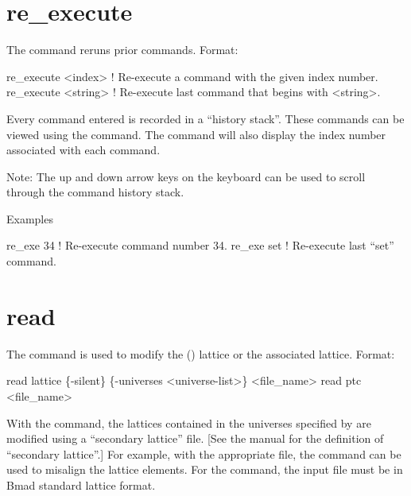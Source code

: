 \section{re_execute}
\label{s:re.exe}

The  command reruns prior commands.  Format:
\begin{example}
  re_execute <index>   ! Re-execute a command with the given index number.
  re_execute <string>  ! Re-execute last command that begins with <string>.
\end{example}

\vskip 10pt 

Every \tao command entered is recorded in a ``history stack''. These commands can be viewed using
the  command. The  command will also display the index number
associated with each command.

Note: The up and down arrow keys on the keyboard can be used to scroll through the command history
stack.

Examples
\begin{example}
  re_exe 34   ! Re-execute command number 34.
  re_exe set  ! Re-execute last ``set'' command.  
\end{example}

\section{read}
\label{s:read}

The  command is used to modify the (\bmad)  lattice or the associated 
lattice. Format:
\begin{example}
  read lattice \{-silent\} \{-universes <universe-list>\} <file_name>
  read ptc <file_name>
\end{example}

\vskip 10pt 

With the  command, the  lattices contained in the universes specified by
 are modified using a ``secondary lattice'' file.  [See the \bmad manual for the
definition of ``secondary lattice''.] For example, with the appropriate file, the  command
can be used to misalign the lattice elements. For the  command, the input file must
be in Bmad standard lattice format.

